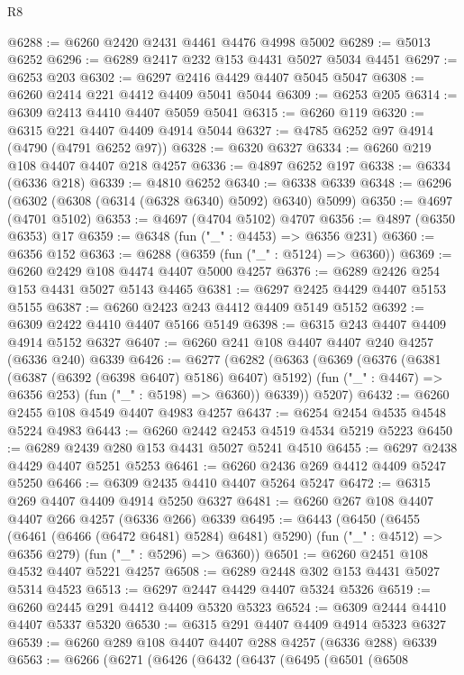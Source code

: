 \begin{lexlean}{R8}
\begin{coremodule}
@6288 := @6260 @2420 @2431 @4461 @4476 @4998 @5002
@6289 := @5013 @6252
@6296 := @6289 @2417 @232 @153 @4431 @5027 @5034 @4451
@6297 := @6253 @203
@6302 := @6297 @2416 @4429 @4407 @5045 @5047
@6308 := @6260 @2414 @221 @4412 @4409 @5041 @5044
@6309 := @6253 @205
@6314 := @6309 @2413 @4410 @4407 @5059 @5041
@6315 := @6260 @119
@6320 := @6315 @221 @4407 @4409 @4914 @5044
@6327 := @4785 @6252 @97 @4914 (@4790 (@4791 @6252 @97))
@6328 := @6320 @6327
@6334 := @6260 @219 @108 @4407 @4407 @218 @4257
@6336 := @4897 @6252 @197
@6338 := @6334 (@6336 @218)
@6339 := @4810 @6252
@6340 := @6338 @6339
@6348 := @6296 (@6302 (@6308 (@6314 (@6328 @6340) @5092) @6340) @5099)
@6350 := @4697 (@4701 @5102)
@6353 := @4697 (@4704 @5102) @4707
@6356 := @4897 (@6350 @6353) @17
@6359 := @6348 (fun ("_" : @4453) => @6356 @231)
@6360 := @6356 @152
@6363 := @6288 (@6359 (fun ("_" : @5124) => @6360))
@6369 := @6260 @2429 @108 @4474 @4407 @5000 @4257
@6376 := @6289 @2426 @254 @153 @4431 @5027 @5143 @4465
@6381 := @6297 @2425 @4429 @4407 @5153 @5155
@6387 := @6260 @2423 @243 @4412 @4409 @5149 @5152
@6392 := @6309 @2422 @4410 @4407 @5166 @5149
@6398 := @6315 @243 @4407 @4409 @4914 @5152 @6327
@6407 := @6260 @241 @108 @4407 @4407 @240 @4257 (@6336 @240) @6339
@6426 := @6277
    (@6282
      (@6363
        (@6369
          (@6376
            (@6381 (@6387 (@6392 (@6398 @6407) @5186) @6407) @5192)
            (fun ("_" : @4467) => @6356 @253)
            (fun ("_" : @5198) => @6360))
          @6339))
      @5207)
@6432 := @6260 @2455 @108 @4549 @4407 @4983 @4257
@6437 := @6254 @2454 @4535 @4548 @5224 @4983
@6443 := @6260 @2442 @2453 @4519 @4534 @5219 @5223
@6450 := @6289 @2439 @280 @153 @4431 @5027 @5241 @4510
@6455 := @6297 @2438 @4429 @4407 @5251 @5253
@6461 := @6260 @2436 @269 @4412 @4409 @5247 @5250
@6466 := @6309 @2435 @4410 @4407 @5264 @5247
@6472 := @6315 @269 @4407 @4409 @4914 @5250 @6327
@6481 := @6260 @267 @108 @4407 @4407 @266 @4257 (@6336 @266) @6339
@6495 := @6443
    (@6450
      (@6455 (@6461 (@6466 (@6472 @6481) @5284) @6481) @5290)
      (fun ("_" : @4512) => @6356 @279)
      (fun ("_" : @5296) => @6360))
@6501 := @6260 @2451 @108 @4532 @4407 @5221 @4257
@6508 := @6289 @2448 @302 @153 @4431 @5027 @5314 @4523
@6513 := @6297 @2447 @4429 @4407 @5324 @5326
@6519 := @6260 @2445 @291 @4412 @4409 @5320 @5323
@6524 := @6309 @2444 @4410 @4407 @5337 @5320
@6530 := @6315 @291 @4407 @4409 @4914 @5323 @6327
@6539 := @6260 @289 @108 @4407 @4407 @288 @4257 (@6336 @288) @6339
@6563 := @6266
    (@6271
      (@6426
        (@6432
          (@6437
            (@6495
              (@6501
                (@6508

\end{coremodule}
\end{lexlean}
